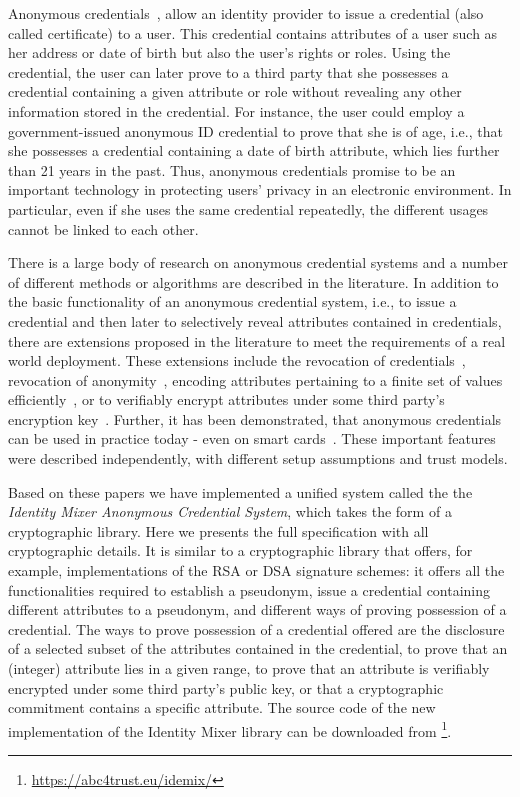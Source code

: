Anonymous credentials~\cite{brands95b,brands95c,camlys01a,chaum85,damgar88},
allow an identity provider to issue a credential (also called certificate) to a user. 
This credential contains attributes of a user such as her address or date of birth but
also the user's rights or roles. 
Using the credential, the user can later prove to a third party that she possesses 
a credential containing a given
attribute or role without revealing any other information stored in the
credential. 
For instance, the user could employ a government-issued anonymous ID
credential to prove that she is of age, i.e., that she possesses a credential
containing a date of birth attribute, which lies further than 21 years in the past. 
Thus, anonymous credentials promise to be an important technology in protecting
users' privacy in an electronic environment.
In particular, even if she uses the same credential repeatedly, the different usages cannot be
linked to each other.


There is a large body of research on anonymous credential systems and a number of
different methods or algorithms are described in the literature. 
In addition to the basic functionality of an anonymous credential system, i.e., 
to issue a credential and then later to selectively reveal attributes contained in 
credentials, there are extensions proposed in the literature to
meet the requirements of a real world deployment. 
These extensions include the  revocation of
credentials~\cite{brdede07,cakoso09,camlys04,nfhf09}, revocation of 
anonymity~\cite{camlys01a}, encoding attributes pertaining to a finite set of values
efficiently~\cite{camgro08}, or to verifiably encrypt attributes under some third
party's encryption key~\cite{camdam00,camsho03}.
Further, it has been demonstrated, that anonymous credentials can be used in practice 
today - even on smart cards~\cite{bcgs09}.
These important features were described independently, with different setup
assumptions and trust models.


Based on these papers we have implemented a unified system called the the {\em
Identity Mixer Anonymous Credential System}, which takes the form of a
cryptographic library.  
Here we presents the full specification with all cryptographic details.  
It is  similar to a cryptographic
library that offers, for example, implementations of the RSA or DSA signature
schemes: it offers all the functionalities required to establish a
pseudonym, issue a credential containing different attributes to a pseudonym,
and different ways of proving possession of a credential. 
The ways to prove possession of a credential offered are the disclosure of a 
selected subset of the
attributes contained in the credential, to prove that an (integer) attribute
lies in a given range, to prove that an attribute is verifiably encrypted under
some third party's public key, or that a cryptographic commitment contains a
specific attribute.  
The source code of the new implementation of the Identity Mixer 
library can be downloaded from \footnote{\url{https://abc4trust.eu/idemix/}}.


